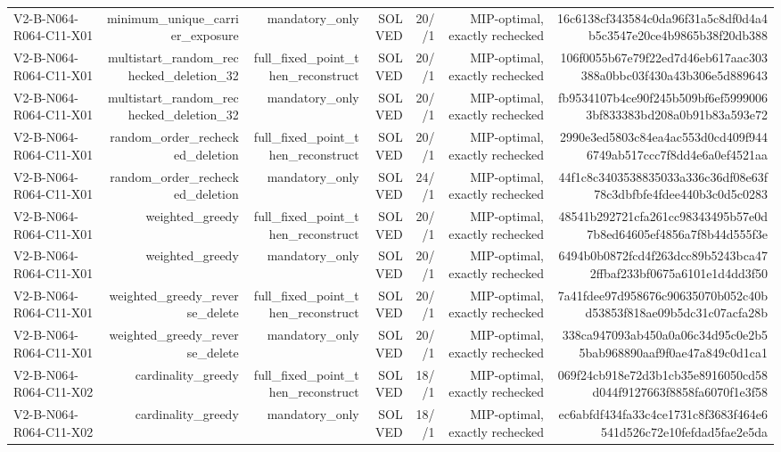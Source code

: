 {\begin{longtable}{lrrrrrr}
V2-B-N064-R064-C11-X01 & minimum\_unique\_carrier\_exposure & mandatory\_only & SOLVED & 20//1 & MIP-optimal, exactly rechecked & 16c6138cf343584c0da96f31a5c8df0d4a4b5c3547e20ce4b9865b38f20db388 \\
V2-B-N064-R064-C11-X01 & multistart\_random\_rechecked\_deletion\_32 & full\_fixed\_point\_then\_reconstruct & SOLVED & 20//1 & MIP-optimal, exactly rechecked & 106f0055b67e79f22ed7d46eb617aac303388a0bbc03f430a43b306e5d889643 \\
V2-B-N064-R064-C11-X01 & multistart\_random\_rechecked\_deletion\_32 & mandatory\_only & SOLVED & 20//1 & MIP-optimal, exactly rechecked & fb9534107b4ce90f245b509bf6ef59990063bf833383bd208a0b91b83a593e72 \\
V2-B-N064-R064-C11-X01 & random\_order\_rechecked\_deletion & full\_fixed\_point\_then\_reconstruct & SOLVED & 20//1 & MIP-optimal, exactly rechecked & 2990e3ed5803c84ea4ac553d0cd409f9446749ab517ccc7f8dd4e6a0ef4521aa \\
V2-B-N064-R064-C11-X01 & random\_order\_rechecked\_deletion & mandatory\_only & SOLVED & 24//1 & MIP-optimal, exactly rechecked & 44f1c8c3403538835033a336c36df08e63f78c3dbfbfe4fdee440b3c0d5c0283 \\
V2-B-N064-R064-C11-X01 & weighted\_greedy & full\_fixed\_point\_then\_reconstruct & SOLVED & 20//1 & MIP-optimal, exactly rechecked & 48541b292721cfa261cc98343495b57e0d7b8ed64605ef4856a7f8b44d555f3e \\
V2-B-N064-R064-C11-X01 & weighted\_greedy & mandatory\_only & SOLVED & 20//1 & MIP-optimal, exactly rechecked & 6494b0b0872fcd4f263dcc89b5243bca472ffbaf233bf0675a6101e1d4dd3f50 \\
V2-B-N064-R064-C11-X01 & weighted\_greedy\_reverse\_delete & full\_fixed\_point\_then\_reconstruct & SOLVED & 20//1 & MIP-optimal, exactly rechecked & 7a41fdee97d958676c90635070b052c40bd53853f818ae09b5dc31c07acfa28b \\
V2-B-N064-R064-C11-X01 & weighted\_greedy\_reverse\_delete & mandatory\_only & SOLVED & 20//1 & MIP-optimal, exactly rechecked & 338ca947093ab450a0a06c34d95c0e2b55bab968890aaf9f0ae47a849c0d1ca1 \\
V2-B-N064-R064-C11-X02 & cardinality\_greedy & full\_fixed\_point\_then\_reconstruct & SOLVED & 18//1 & MIP-optimal, exactly rechecked & 069f24cb918e72d3b1cb35e8916050cd58d044f9127663f8858fa6070f1e3f58 \\
V2-B-N064-R064-C11-X02 & cardinality\_greedy & mandatory\_only & SOLVED & 18//1 & MIP-optimal, exactly rechecked & ec6abfdf434fa33c4ce1731c8f3683f464e6541d526c72e10fefdad5fae2e5da \\

\end{longtable}}
